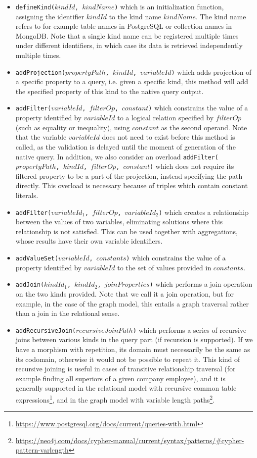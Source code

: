 \begin{itemize}
    \item \texttt{defineKind($kindId$, $kindName$)} which is an initialization function, assigning the identifier $kindId$ to the kind name $kindName$. The kind name refers to for example table names in PostgreSQL or collection names in MongoDB. Note that a single kind name can be registered multiple times under different identifiers, in which case its data is retrieved independently multiple times.
    \item \texttt{addProjection($propertyPath$, $kindId$, $variableId$)} which adds projection of a specific property to a query, i.e. given a specific kind, this method will add the specified property of this kind to the native query output.
    \item \texttt{addFilter($variableId$, $filterOp$, $constant$)} which constrains the value of a property identified by $variableId$ to a logical relation specified by $filterOp$ (such as equality or inequality), using $constant$ as the second operand. Note that the variable $variableId$ does not need to exist before this method is called, as the validation is delayed until the moment of generation of the native query. In addition, we also consider an overload \texttt{addFilter($propertyPath$, $kindId$, $filterOp$, $constant$)} which does not require its filtered property to be a part of the projection, instead specifying the path directly. This overload is necessary because of triples which contain constant literals.
    \item \texttt{addFilter($variableId_1$, $filterOp$, $variableId_2$)} which creates a relationship between the values of two variables, eliminating solutions where this relationship is not satisfied. This can be used together with aggregations, whose results have their own variable identifiers.
    \item \texttt{addValueSet($variableId$, $constants$)} which constrains the value of a property identified by $variableId$ to the set of values provided in $constants$.
    \item \texttt{addJoin($kindId_1$, $kindId_2$, $joinProperties$)} which performs a join operation on the two kinds provided. Note that we call it a join operation, but for example, in the case of the graph model, this entails a graph traversal rather than a join in the relational sense.
    \item \texttt{addRecursiveJoin($recursiveJoinPath$)} which performs a series of recursive joins between various kinds in the query part (if recursion is supported). If we have a morphism with repetition, its domain must necessarily be the same as its codomain, otherwise it would not be possible to repeat it. This kind of recursive joining is useful in cases of transitive relationship traversal (for example finding all superiors of a given company employee), and it is generally supported in the relational model with recursive common table expressions\footnote{\url{https://www.postgresql.org/docs/current/queries-with.html}}, and in the graph model with variable length paths\footnote{\url{https://neo4j.com/docs/cypher-manual/current/syntax/patterns/\#cypher-pattern-varlength}}.

\end{itemize}
